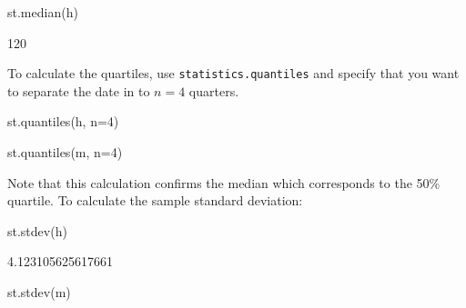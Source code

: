 \begin{pyin}
st.median(h)
\end{pyin}





\begin{raw}
120
\end{raw}





To calculate the quartiles, use \texttt{statistics.quantiles} and specify that
you
want to separate the date in to \(n=4\) quarters.




\begin{pyin}
st.quantiles(h, n=4)
\end{pyin}





\begin{raw}
[64.0, 65.0, 71.0]
\end{raw}







\begin{pyin}
st.quantiles(m, n=4)
\end{pyin}





\begin{raw}
[21.0, 120.0, 237.0]
\end{raw}





Note that this calculation confirms the median which corresponds to the 50\%
quartile.
To calculate the sample standard deviation:




\begin{pyin}
st.stdev(h)
\end{pyin}





\begin{raw}
4.123105625617661
\end{raw}







\begin{pyin}
st.stdev(m)
\end{pyin}





